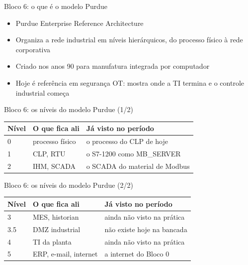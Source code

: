 \documentclass[12pt, aspectratio=169]{beamer}
\newcommand{\tblhead}[1]{\textcolor{TextPrimary}{\textbf{#1}}}
\begin{document}
\begin{frame}{Bloco 6: o que é o modelo Purdue}
  \vspace{0.4cm}
  \begin{itemize}
    \item Purdue Enterprise Reference Architecture
    \item Organiza a rede industrial em níveis hierárquicos, do processo físico à rede corporativa
    \item Criado nos anos 90 para manufatura integrada por computador
    \item Hoje é referência em segurança OT: mostra onde a TI termina e o controle industrial começa
  \end{itemize}
\end{frame}

\begin{frame}{Bloco 6: os níveis do modelo Purdue (1/2)}
  \vspace{0.3cm}
  \small
  \begin{tabularx}{\textwidth}{@{}l X X@{}}
    \rowcolor{PanelEdge}
    \tblhead{Nível} & \tblhead{O que fica ali} & \tblhead{Já visto no período} \\
    \midrule
    \rowcolor{PanelBg}
    0 & processo físico & o processo do CLP de hoje \\
    \rowcolor{PanelBg}
    1 & CLP, RTU & o S7-1200 como MB\_SERVER \\
    \rowcolor{PanelBg}
    2 & IHM, SCADA & o SCADA do material de Modbus \\
  \end{tabularx}
\end{frame}

\begin{frame}{Bloco 6: os níveis do modelo Purdue (2/2)}
  \vspace{0.3cm}
  \small
  \begin{tabularx}{\textwidth}{@{}l X X@{}}
    \rowcolor{PanelEdge}
    \tblhead{Nível} & \tblhead{O que fica ali} & \tblhead{Já visto no período} \\
    \midrule
    \rowcolor{PanelBg}
    3 & MES, historian & ainda não visto na prática \\
    \rowcolor{PanelBg}
    3.5 & DMZ industrial & não existe hoje na bancada \\
    \rowcolor{PanelBg}
    4 & TI da planta & ainda não visto na prática \\
    \rowcolor{PanelBg}
    5 & ERP, e-mail, internet & a internet do Bloco 0 \\
  \end{tabularx}
\end{frame}
\end{document}

